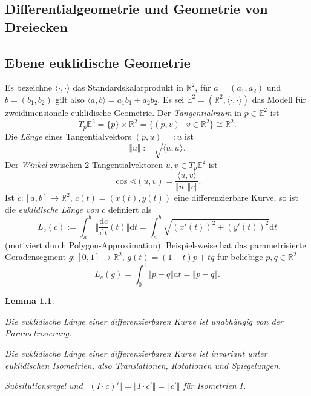 \documentclass[11pt]{book}
\numberwithin{dummy}{section}
\newtheorem{lemma}[theorem]{Lemma}
\theoremstyle{nonumberbreak}
\newenvironment{pr}[1][]{\ifthenelse{\equal{#1}{}}{\proof}{\proof[#1]}\rm}{\endproof}
\newcommand{\R}{\mathbb{R}}
\newcommand{\la}{\longrightarrow}
\newcommand{\ssp}{\langle \cdot, \cdot \rangle}
\begin{document}
\begin{spacing}{1.4}
\chapter{Differentialgeometrie und Geometrie von Dreiecken} %
\setlength\abovedisplayshortskip{0pt}
\setlength\belowdisplayshortskip{10pt}
\setlength\abovedisplayskip{10pt}
\setlength\belowdisplayskip{10pt}
 



\section{Ebene euklidische Geometrie} %

\thispagestyle{empty}


Es bezeichne $\ssp$ das Standardskalarprodukt in $\R^2$, für $a=(a_1,a_2)$ und $b=(b_1,b_2)$ gilt also $\langle a,b \rangle = a_1 b_1 + a_2 b_2$. Es sei $\mathbb{E}^2 = (\mathbb{R}^2, \ssp)$ das Modell für zweidimensionale euklidische Geometrie. Der \textit{Tangentialraum} in $p \in \mathbb{E}^2$ ist 
$$T_p\mathbb{E}^2 = \{p \} \times \mathbb{R}^2 = \{ (p,v) \ \vert \ v \in \R^2 \} \cong \R^2.$$
Die \textit{Länge} eines Tangentialvektors $(p,u) =: u$ ist 
$$\Vert u \Vert := \sqrt{ \langle u, u \rangle}.$$
Der \textit{Winkel} zwischen 2 Tangentialvektoren $u,v \in T_p \mathbb{E}^2$ ist 
$$\cos \sphericalangle(u,v) = \frac{\langle u,v \rangle}{\Vert u \Vert \Vert v \Vert}.$$
Ist $c: [a,b] \la \R^2$, $c(t) = (x(t), y(t))$ eine differenzierbare Kurve, so ist die \textit{euklidische Länge von} $c$ definiert als 
$$L_e(c) := \int_a^b \  \bigg\Vert \frac{\mathrm{d}c}{\mathrm{d}t}(t) \bigg\Vert \mathrm{d}t = \int_a^b \sqrt{ (x'(t))^2 + (y'(t))^2} \mathrm{d} t$$
(motiviert durch Polygon-Approximation). Beispielsweise hat das parametrisierte Geradensegment $g: [0,1] \la \R^2$, $g(t) = (1-t)p + tq$ für beliebige $p,q \in \R^2$ 
$$L_e(g) = \int_0^1 \Vert p-q \Vert \mathrm{d} t = \Vert p-q \Vert.$$



\hypertarget{lemmazweieinseins}{}
\begin{lemma}   %
\begin{compactenum}
\item Die euklidische Länge einer differenzierbaren Kurve ist unabhängig von der Parametrisierung.
\item Die euklidische Länge einer differenzierbaren Kurve ist invariant unter euklidischen Isometrien, also Translationen, Rotationen und Spiegelungen.
\end{compactenum}
\begin{pr}[Beweisidee.]
Subsitutionsregel und $\Vert(I \cdot c)'\Vert = \Vert I \cdot c' \Vert = \Vert c' \Vert$ für Isometrien $I$.
\end{pr}


\end{lemma}
\end{spacing}
\end{document}
